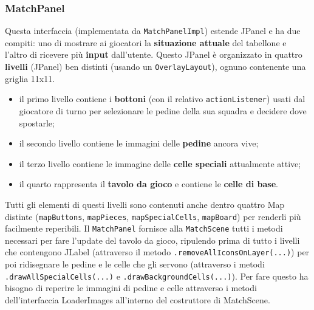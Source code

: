\documentclass[a4paper,12pt]{report}
\begin{document}
\subsubsection{MatchPanel}

Questa interfaccia (implementata da \texttt{MatchPanelImpl}) estende JPanel e ha due compiti: uno di mostrare ai giocatori la \textbf{situazione attuale} del tabellone e l'altro di ricevere più \textbf{input} dall'utente. Questo JPanel è organizzato in quattro \textbf{livelli} (JPanel) ben distinti (usando un \texttt{OverlayLayout}), ognuno contenente una griglia 11x11.
\begin{itemize}
\item il primo livello contiene i \textbf{bottoni} (con il relativo \texttt{actionListener}) usati dal giocatore di turno per selezionare le pedine della sua squadra e decidere dove spostarle;
\item il secondo livello contiene le immagini delle \textbf{pedine} ancora vive;
\item il terzo livello contiene le immagine delle \textbf{celle speciali} attualmente attive;
\item il quarto rappresenta il \textbf{tavolo da gioco} e contiene le \textbf{celle di base}.
\end{itemize}
Tutti gli elementi di questi livelli sono contenuti anche dentro quattro Map distinte (\texttt{mapButtons}, \texttt{mapPieces}, \texttt{mapSpecialCells}, \texttt{mapBoard}) per
renderli più facilmente reperibili.
Il \texttt{MatchPanel} fornisce alla \texttt{MatchScene} tutti i metodi necessari per fare l'update del tavolo da gioco, 
ripulendo prima di tutto i livelli che contengono JLabel (attraverso il metodo \texttt{.removeAllIconsOnLayer(...)})
per poi ridisegnare le pedine e le celle che gli servono (attraverso i metodi \texttt{.drawAllSpecialCells(...)} e \texttt{.drawBackgroundCells(...)}). 
Per fare questo ha bisogno di reperire le immagini di pedine e celle attraverso 
i metodi dell'interfaccia LoaderImages all'interno del costruttore di MatchScene. 
\end{document}

